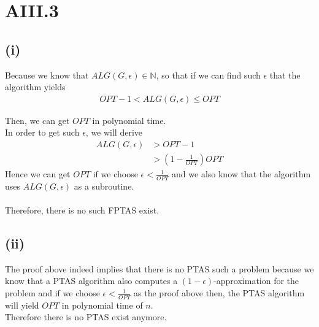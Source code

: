 \section* {AIII.3}
\label {a3-3}
\subsection*{(i)}
Because we know that $ALG(G,\epsilon) \in \mathbb{N}$, so that if we can find such $\epsilon$ that the algorithm yields
\begin{align*}
	OPT - 1 < ALG\left(G,\epsilon \right) \leq OPT
\end{align*}

Then, we can get $OPT$ in polynomial time.\\

In order to get such $\epsilon$, we will derive
\begin{align*}
	ALG\left(G,\epsilon\right) &> OPT - 1\\
	&> \left( 1 - \frac{1}{OPT} \right)OPT
\end{align*}
%	
Hence we can get $OPT$ if we choose $\epsilon < \frac{1}{OPT}$ and we also know that the algorithm uses $ALG(G,\epsilon)$ as a subroutine. \\ \\

Therefore, there is no such FPTAS exist.

\subsection*{(ii)}

The proof above indeed implies that there is no PTAS such a problem because we know that a PTAS algorithm also computes a $(1 - \epsilon)$-approximation for the problem and if we choose $\epsilon < \frac{1}{OPT}$ as the proof above then, the PTAS algorithm will yield $OPT$ in polynomial time of $n$. \\

Therefore there is no PTAS exist anymore.


	

